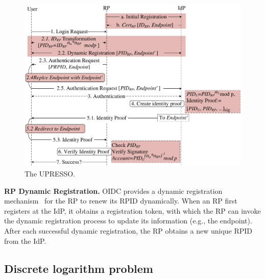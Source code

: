 \begin{figure}[t]
  \centering
  \includegraphics[width=\linewidth]{fig/overview1.pdf}
  \caption{The UPRESSO.}
  \label{fig:UPRESSO}
\end{figure}

\noindent\textbf{RP Dynamic Registration.} OIDC provides a dynamic registration mechanism~\cite{DynamicRegistration} for the RP to renew its RPID dynamically. %
When an RP first registers at the IdP, it obtains a registration token, with which the  RP can invoke the dynamic registration process to
update its information (e.g., the endpoint). %
After each successful dynamic registration, the RP obtains a new unique RPID from the IdP.


\subsection{Discrete logarithm problem}
\label{sec:dlp}

